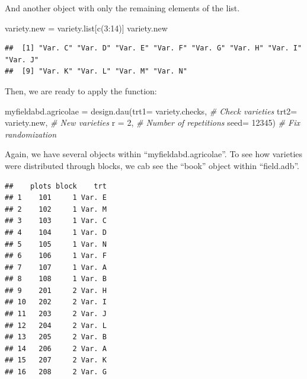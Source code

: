 \documentclass[
]{book}
\newenvironment{Shaded}{\begin{snugshade}}{\end{snugshade}}
\newcommand{\AttributeTok}[1]{\textcolor[rgb]{0.77,0.63,0.00}{#1}}
\newcommand{\CommentTok}[1]{\textcolor[rgb]{0.56,0.35,0.01}{\textit{#1}}}
\newcommand{\DecValTok}[1]{\textcolor[rgb]{0.00,0.00,0.81}{#1}}
\newcommand{\FunctionTok}[1]{\textcolor[rgb]{0.00,0.00,0.00}{#1}}
\newcommand{\NormalTok}[1]{#1}
\newcommand{\OtherTok}[1]{\textcolor[rgb]{0.56,0.35,0.01}{#1}}
\newcommand{\SpecialCharTok}[1]{\textcolor[rgb]{0.00,0.00,0.00}{#1}}
\begin{document}
And another object with only the remaining elements of the list.

\begin{Shaded}
\begin{Highlighting}[]
\NormalTok{variety.new }\OtherTok{=}\NormalTok{ variety.list[}\FunctionTok{c}\NormalTok{(}\DecValTok{3}\SpecialCharTok{:}\DecValTok{14}\NormalTok{)]}
\NormalTok{variety.new}
\end{Highlighting}
\end{Shaded}

\begin{verbatim}
##  [1] "Var. C" "Var. D" "Var. E" "Var. F" "Var. G" "Var. H" "Var. I" "Var. J"
##  [9] "Var. K" "Var. L" "Var. M" "Var. N"
\end{verbatim}

Then, we are ready to apply the function:

\begin{Shaded}
\begin{Highlighting}[]
\NormalTok{myfieldabd.agricolae }\OtherTok{=} \FunctionTok{design.dau}\NormalTok{(}\AttributeTok{trt1=}\NormalTok{ variety.checks, }\CommentTok{\# Check varieties}
                        \AttributeTok{trt2=}\NormalTok{ variety.new,    }\CommentTok{\# New varieties}
                        \AttributeTok{r =} \DecValTok{2}\NormalTok{,                }\CommentTok{\# Number of repetitions}
                        \AttributeTok{seed=} \DecValTok{12345}\NormalTok{)      }\CommentTok{\# Fix randomization}
\end{Highlighting}
\end{Shaded}

Again, we have several objects within ``myfieldabd.agricolae''. To see how varieties were distributed through blocks, we cab see the ``book'' object within ``field.adb''.

\begin{Shaded}
\end{Shaded}

\begin{verbatim}
##    plots block    trt
## 1    101     1 Var. E
## 2    102     1 Var. M
## 3    103     1 Var. C
## 4    104     1 Var. D
## 5    105     1 Var. N
## 6    106     1 Var. F
## 7    107     1 Var. A
## 8    108     1 Var. B
## 9    201     2 Var. H
## 10   202     2 Var. I
## 11   203     2 Var. J
## 12   204     2 Var. L
## 13   205     2 Var. B
## 14   206     2 Var. A
## 15   207     2 Var. K
## 16   208     2 Var. G
\end{verbatim}
\end{document}
